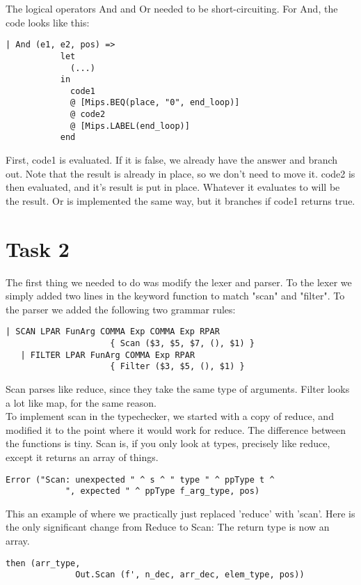 \documentclass[10pt]{article}
\begin{document}
The logical operators And and Or needed to be short-circuiting. For And, the code looks like this:

\begin{Verbatim}[frame=single]
       | And (e1, e2, pos) =>
           let
             (...)
           in
             code1
             @ [Mips.BEQ(place, "0", end_loop)]
             @ code2
             @ [Mips.LABEL(end_loop)]
           end
\end{Verbatim}
First, code1 is evaluated. If it is false, we already have the answer and branch out. Note that the result is already in place, so we don't need to move it. code2 is then evaluated, and it's result is put in place. Whatever it evaluates to will be the result. Or is implemented the same way, but it branches if code1 returns true.

\section{Task 2}
The first thing we needed to do was modify the lexer and parser. To the lexer we simply added two lines in the keyword function to match "scan" and "filter".
To the parser we added the following two grammar rules:
\begin{Verbatim}[frame=single]
   | SCAN LPAR FunArg COMMA Exp COMMA Exp RPAR
                     { Scan ($3, $5, $7, (), $1) }
   | FILTER LPAR FunArg COMMA Exp RPAR
                     { Filter ($3, $5, (), $1) }
\end{Verbatim}
Scan parses like reduce, since they take the same type of arguments. Filter looks a lot like map, for the same reason.\\

To implement scan in the typechecker, we started with a copy of reduce, and modified it to the point where it would work for reduce. The difference between the functions is tiny. Scan is, if you only look at types, precisely like reduce, except it returns an array of things.

\begin{Verbatim}[frame=single]
	Error ("Scan: unexpected " ^ s ^ " type " ^ ppType t ^
            ", expected " ^ ppType f_arg_type, pos)
\end{Verbatim}

This an example of where we practically just replaced 'reduce' with 'scan'. Here is the only significant change from Reduce to Scan: The return type is now an array.

\begin{Verbatim}[frame=single]
    then (arr_type,
    	      Out.Scan (f', n_dec, arr_dec, elem_type, pos))
\end{Verbatim}
\end{document}
